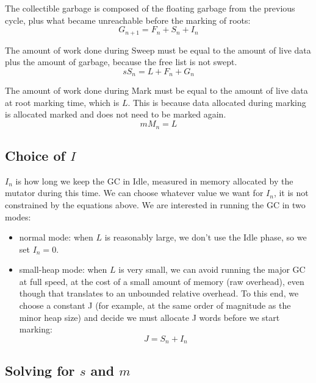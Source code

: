 \documentclass{article}
\begin{document}
The collectible garbage is composed of the floating garbage from the
previous cycle, plus what became unreachable before the marking of
roots:
\begin{equation}\label{eqn-G}
  G_{n+1} = F_n + S_n + I_n
\end{equation}

The amount of work done during Sweep must be equal to the amount of
live data plus the amount of garbage, because the free list is not
swept.
\begin{equation}\label{eqn-sS}
sS_n = L + F_n + G_n
\end{equation}

The amount of work done during Mark must be equal to the amount of
live data at root marking time, which is $L$. This is because data
allocated during marking is allocated marked and does not need to be
marked again.
\begin{equation}\label{eqn-mM}
mM_n = L
\end{equation}

\subsection[Choice of I]{Choice of $I$}

$I_n$ is how long we keep the GC in Idle, measured in memory allocated
by the mutator during this time. We can choose whatever value we want
for $I_n$, it is not constrained by the equations above. We are
interested in running the GC in two modes:
\begin{itemize}
\item normal mode: when $L$ is reasonably large, we don't use the Idle
phase, so we set $I_n = 0$.
\item small-heap mode: when $L$ is very small,  we can avoid running
the major GC at full speed, at the cost of a small amount of memory
(raw overhead), even though that translates to an unbounded relative
overhead. To this end, we choose a constant J (for example, at the
same order of magnitude as the minor heap size) and decide we must
allocate J words before we start marking:
\begin{equation}\label{def-J}
  J = S_n + I_n
\end{equation}
\end{itemize}

\subsection[Solving for s and m]{Solving for $s$ and $m$}
\end{document}
